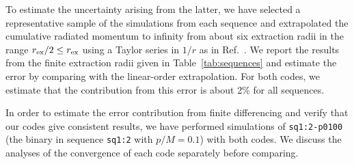 \documentclass[floats,floatfix,showpacs,amssymb,physrev,twocolumn,superscriptaddress,reprint,
nofootinbib, longbibliography]{revtex4-2}
\begin{document}
To estimate the uncertainty arising from the latter, we have selected a
representative sample of the simulations from each sequence and extrapolated 
the cumulative radiated momentum to infinity from about six extraction
radii in the range $r_{\rm ex}/2 \le r_{\rm ex}$ 
using a Taylor series in $1/r$ as in 
Ref.~\cite{Sperhake:2011zz}. We report the results from the finite 
extraction radii given in Table~\ref{tab:sequences} and estimate the 
error by comparing with the linear-order extrapolation.
For both codes, we estimate that the contribution from this error is about
2\% 
for all sequences.

In order to estimate the error contribution from finite differencing and
verify that our codes give consistent results, we have performed simulations
of \texttt{sq1:2-p0100} (the binary in sequence \texttt{sq1:2} with 
$p/M = 0.1$) with both codes. We discuss the analyses of the convergence
of each code separately before comparing.
\end{document}
